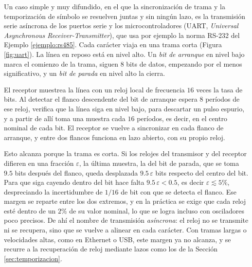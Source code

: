 \begin{ejemplo}\label{ejemplo:uart}
Un caso simple y muy difundido, en el que la sincronización de trama y la temporización de símbolo se resuelven juntas y sin ningún lazo, es la transmisión serie asíncrona de los puertos serie y los microcontroladores (UART, \emph{Universal Asynchronous Receiver-Transmitter}), que usa por ejemplo la norma RS-232 del Ejemplo \ref{ejemplo:rs485}. Cada carácter viaja en una trama corta (Figura \ref{fig:uart}). La línea en reposo está en nivel alto. Un \emph{bit de arranque} en nivel bajo marca el comienzo de la trama, siguen $8$ bits de datos, empezando por el menos significativo, y un \emph{bit de parada} en nivel alto la cierra.

El receptor muestrea la línea con un reloj local de frecuencia $16$ veces la tasa de bits. Al detectar el flanco descendente del bit de arranque espera $8$ períodos de ese reloj, verifica que la línea siga en nivel bajo, para descartar un pulso espurio, y a partir de allí toma una muestra cada $16$ períodos, es decir, en el centro nominal de cada bit. El receptor se vuelve a sincronizar en cada flanco de arranque, y entre dos flancos funciona en lazo abierto, con su propio reloj.

Esto alcanza porque la trama es corta. Si los relojes del transmisor y del receptor difieren en una fracción $\varepsilon$, la última muestra, la del bit de parada, que se toma $9.5$ bits después del flanco, queda desplazada $9.5\,\varepsilon$ bits respecto del centro del bit. Para que siga cayendo dentro del bit hace falta $9.5\,\varepsilon<0.5$, es decir $\varepsilon\lesssim 5\%$, despreciando la incertidumbre de $1/16$ de bit con que se detecta el flanco. Ese margen se reparte entre los dos extremos, y en la práctica se exige que cada reloj esté dentro de un $2\%$ de su valor nominal, lo que se logra incluso con osciladores poco precisos. De ahí el nombre de transmisión \emph{asíncrona}: el reloj no se transmite ni se recupera, sino que se vuelve a alinear en cada carácter. Con tramas largas o velocidades altas, como en Ethernet o USB, este margen ya no alcanza, y se recurre a la recuperación de reloj mediante lazos como los de la Sección \ref{sec:temporizacion}.
\end{ejemplo}

